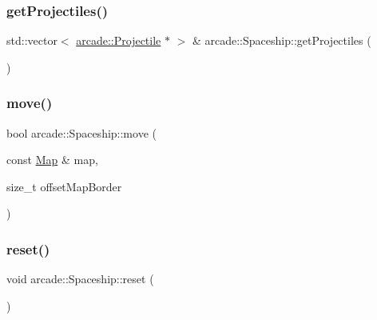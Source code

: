 \mbox{\label{classarcade_1_1_spaceship_a3f45b690df3d418a89b042ec12627feb}} 
\subsubsection{\texorpdfstring{get\+Projectiles()}{getProjectiles()}}
{\footnotesize\ttfamily std\+::vector$<$ \hyperlink{classarcade_1_1_projectile}{arcade\+::\+Projectile} $\ast$ $>$ \& arcade\+::\+Spaceship\+::get\+Projectiles (\begin{DoxyParamCaption}{ }\end{DoxyParamCaption})}

\mbox{\label{classarcade_1_1_spaceship_a2142187204afe7429d4383471769a414}} 
\subsubsection{\texorpdfstring{move()}{move()}}
{\footnotesize\ttfamily bool arcade\+::\+Spaceship\+::move (\begin{DoxyParamCaption}\item[{const \hyperlink{classarcade_1_1_map}{Map} \&}]{map,  }\item[{size\+\_\+t}]{offset\+Map\+Border }\end{DoxyParamCaption})\hspace{0.3cm}{\ttfamily [virtual]}}

\mbox{\label{classarcade_1_1_spaceship_ab99c1fba278325a45c67224583d800be}} 
\subsubsection{\texorpdfstring{reset()}{reset()}}
{\footnotesize\ttfamily void arcade\+::\+Spaceship\+::reset (\begin{DoxyParamCaption}{ }\end{DoxyParamCaption})}

